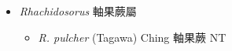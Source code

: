 
  \begin{itemize}
 \item[] \textit{Rhachidosorus} 軸果蕨屬
                                
  \begin{itemize}
        \item[] \textit{R. pulcher} (Tagawa) Ching  軸果蕨   NT
  \end{itemize}
  \end{itemize}
